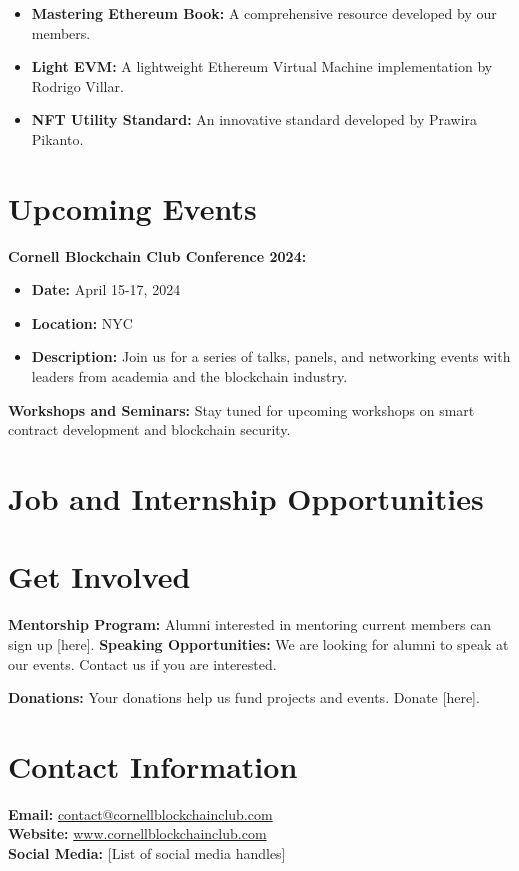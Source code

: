 \documentclass[10pt]{article}
\begin{document}
\vspace{1cm}

\begin{itemize}
    \item \textbf{Mastering Ethereum Book:} A comprehensive resource developed by our members.
    \item \textbf{Light EVM:} A lightweight Ethereum Virtual Machine implementation by Rodrigo Villar.
    \item \textbf{NFT Utility Standard:} An innovative standard developed by Prawira Pikanto.
\end{itemize}

\vspace{1cm}

\section*{Upcoming Events}
\textbf{Cornell Blockchain Club Conference 2024:}
\begin{itemize}
    \item \textbf{Date:} April 15-17, 2024
    \item \textbf{Location:} NYC
    \item \textbf{Description:} Join us for a series of talks, panels, and networking events with leaders from academia and the blockchain industry.
\end{itemize}

\textbf{Workshops and Seminars:}
Stay tuned for upcoming workshops on smart contract development and blockchain security.

\vspace{1cm}

\section*{Job and Internship Opportunities}


\vspace{1cm}

\section*{Get Involved}
\textbf{Mentorship Program:} Alumni interested in mentoring current members can sign up [here].
\noindent
\textbf{Speaking Opportunities:} We are looking for alumni to speak at our events. Contact us if you are interested.

\textbf{Donations:} Your donations help us fund projects and events. Donate [here].

\vspace{1cm}

\section*{Contact Information}
\textbf{Email:} \href{mailto:contact@cornellblockchainclub.com}{contact@cornellblockchainclub.com} \\
\textbf{Website:} \href{https://www.cornellblockchainclub.com}{www.cornellblockchainclub.com} \\
\textbf{Social Media:} [List of social media handles]
\end{document}
